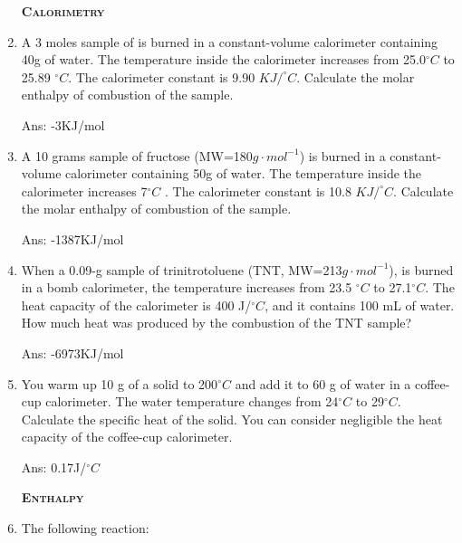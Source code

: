 \documentclass[main.tex]{subfiles}
\begin{document}
\begin{multicols*}{2}
\begin{enumerate}
{\raggedright\textsc{\textbf{Calorimetry }}\par}

\item A 3 moles sample of  is burned in a constant-volume calorimeter containing 40g of water. The temperature inside the calorimeter increases from 25.0$^{\circ}C$ to 25.89 $^{\circ}C$. The calorimeter constant is 9.90 $KJ/^{\circ}C$.  Calculate the molar enthalpy of combustion of the sample. 
\begin{flushright}\small Ans: -3KJ/mol\end{flushright}

\item A 10 grams sample of fructose (MW=180$g\cdot mol^{-1}$) is burned in a constant-volume calorimeter containing 50g of water. The temperature inside the calorimeter increases 7$^{\circ}C$ . The calorimeter constant is 10.8 $KJ/^{\circ}C$.  Calculate the molar enthalpy of combustion of the sample. 
\begin{flushright}\small Ans: -1387KJ/mol\end{flushright}

\item When a 0.09-g sample of trinitrotoluene (TNT, MW=213$g\cdot mol^{-1}$), is burned in a bomb calorimeter, the temperature increases from 23.5 $^{\circ}C$ to 27.1$^{\circ}C$. The heat capacity of the calorimeter is 400 J/$^{\circ}C$, and it contains 100 mL of water. How much heat was produced by the combustion of the TNT sample?
\begin{flushright}\small Ans: -6973KJ/mol\end{flushright}

\item You warm up 10 g of a solid to 200$^{\circ}C$ and add it to 60 g of water in a coffee-cup calorimeter. The water temperature changes from 24$^{\circ}C$ to 29$^{\circ}C$. Calculate the specific heat of the solid. You can consider negligible the heat capacity of the coffee-cup calorimeter.
\begin{flushright}\small Ans: 0.17J/$^{\circ}C$\end{flushright}


{\raggedright\textsc{\textbf{Enthalpy }}\par}
\item The following reaction:
\begin{center}\end{center}
\begin{enumerate}[label=(\alph*)]
\end{enumerate}



\end{enumerate}
\end{multicols*}
\end{document}
